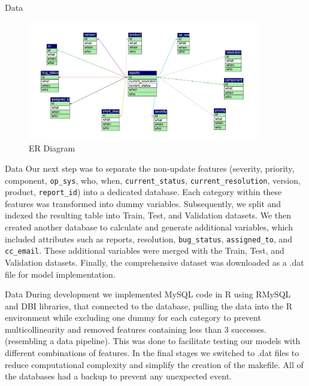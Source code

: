 \documentclass[10pt]{beamer}
\begin{document}
\begin{frame}[t]{Data}\justifying \vspace{10pt}
\begin{figure}[htp]
	\centering
	\includegraphics[width=0.9\textwidth]{./ER_diagram.jpg}
	\caption{ER Diagram}
	\label{fig:picture1}
\end{figure}
\end{frame}


\begin{frame}[t]{Data}\justifying \vspace{20pt}
	Our next step was to separate the non-update features (severity, priority, component, \texttt{op\_sys}, who, when, \texttt{current\_status}, \texttt{current\_resolution}, version, product, \texttt{report\_id}) into a dedicated database. Each category within these features was transformed into dummy variables. Subsequently, we split and indexed the resulting table into Train, Test, and Validation datasets. 
	\vskip 10pt 
	We then created another database to calculate and generate additional variables, which included attributes such as reports, resolution, \texttt{bug\_status}, \texttt{assigned\_to}, and \texttt{cc\_email}. These additional variables were merged with the Train, Test, and Validation datasets. Finally, the comprehensive dataset was downloaded as a .dat file for model implementation.
\end{frame}


\begin{frame}[t]{Data}\justifying \vspace{20pt}
	During development we implemented MySQL code in R using RMySQL and DBI libraries, that connected to the database, pulling the data into the R environment while excluding one dummy for each category to prevent multicollinearity and removed features containing less than 3 successes. (resembling a data pipeline). This was done to facilitate testing our models with different combinations of features. In the final stages we switched to .dat files to reduce computational complexity and simplify the creation of the makefile. All of the databases had a backup to prevent any unexpected event.
\end{frame}
\end{document}
